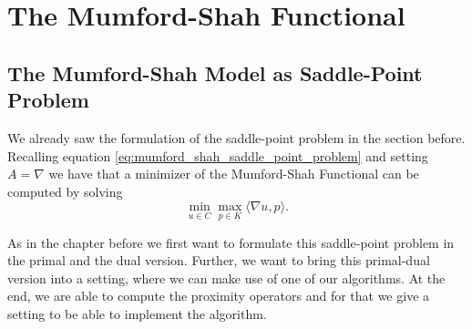 \section{The Mumford-Shah Functional} %
\label{sec:the_mumford_shah_functional}

	\subsection{The Mumford-Shah Model as Saddle-Point Problem} %
	\label{sub:the_mumford_shah_model_as_saddle_point_problem}
	
		We already saw the formulation of the saddle-point problem in the section before. Recalling equation \ref{eq:mumford_shah_saddle_point_problem} and setting $A = \nabla$ we have that a minimizer of the Mumford-Shah Functional can be computed by solving
			\begin{equation}
				\min_{u \in C} \max_{p \in K} \langle \nabla u, p \rangle.
				\label{eq:primal_dual_mumford_shah}
			\end{equation}

		As in the chapter before we first want to formulate this saddle-point problem in the primal and the dual version. Further, we want to bring this primal-dual version into a setting, where we can make use of one of our algorithms. At the end, we are able to compute the proximity operators and for that we give a setting to be able to implement the algorithm.

